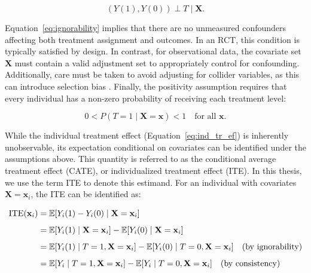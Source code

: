 \begin{equation}
(Y(1), Y(0)) \perp T \mid \mathbf{X}.
\label{eq:ignorability}
\end{equation}

Equation~\ref{eq:ignorability} implies that there are no unmeasured confounders affecting both treatment assignment and outcomes. In an RCT, this condition is typically satisfied by design. In contrast, for observational data, the covariate set $\mathbf{X}$ must contain a valid adjustment set to appropriately control for confounding. Additionally, care must be taken to avoid adjusting for collider variables, as this can introduce selection bias \citep{elwert2014, hernan2025}. Finally, the positivity assumption requires that every individual has a non-zero probability of receiving each treatment level:

\begin{equation}
0 < P(T = 1 \mid \mathbf{X} = \mathbf{x}) < 1 \quad \text{for all } \mathbf{x}.
\end{equation}

\medskip

While the individual treatment effect (Equation~\ref{eq:ind_tr_ef}) is inherently unobservable, its expectation conditional on covariates can be identified under the assumptions above. This quantity is referred to as the conditional average treatment effect (CATE), or individualized treatment effect (ITE). In this thesis, we use the term ITE to denote this estimand. For an individual with covariates \( \mathbf{X} = \mathbf{x}_i \), the ITE can be identified as:

\medskip



\begin{align}
\label{eq:ite}
\text{ITE}(\mathbf{x}_i) &= \mathbb{E}[Y_i(1) - Y_i(0) \mid \mathbf{X} = \mathbf{x}_i] \notag \\[0.5em]
&= \mathbb{E}[Y_i(1) \mid \mathbf{X} = \mathbf{x}_i] - \mathbb{E}[Y_i(0) \mid \mathbf{X} = \mathbf{x}_i] \notag \\[0.5em]
&= \mathbb{E}[Y_i(1) \mid T = 1, \mathbf{X} = \mathbf{x}_i] 
 - \mathbb{E}[Y_i(0) \mid T = 0, \mathbf{X} = \mathbf{x}_i] \quad \text{(by ignorability)} \notag \\[0.5em]
&= \mathbb{E}[Y_i \mid T = 1, \mathbf{X} = \mathbf{x}_i] 
 - \mathbb{E}[Y_i \mid T = 0, \mathbf{X} = \mathbf{x}_i] \quad \text{(by consistency)}
\end{align}



